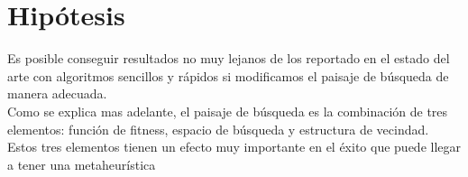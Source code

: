 \section{Hipótesis}
Es posible conseguir resultados no muy lejanos de los reportado en el estado del arte con algoritmos sencillos y rápidos si modificamos el paisaje de búsqueda de manera adecuada.\\
Como se explica mas adelante, el paisaje de búsqueda es la combinación de tres elementos: función de fitness, espacio de búsqueda y estructura de vecindad. Estos tres elementos tienen un efecto muy importante en el éxito que puede llegar a tener una metaheurística
